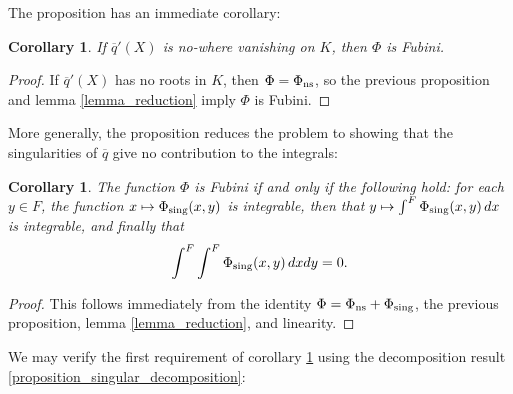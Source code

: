 \documentclass{lmsMODIFIED}
\newtheorem{corollary}[theorem]{Corollary}
\newcommand{\res}[1]{\overline{#1}}
\newcommand{\sub}[1]{{\mbox{\scriptsize {#1}}}}
\begin{document}
The proposition has an immediate corollary:

\begin{corollary}\label{corollary_nowhere_singular}
If $\res{q}'(X)$ is no-where vanishing on $ K $, then $\Phi$ is Fubini.
\end{corollary}
\begin{proof}
If $\res{q}'(X)$ has no roots in $ K $, then $\Phi=\Phi_\sub{ns}$, so the previous proposition and lemma \ref{lemma_reduction} imply $\Phi$ is Fubini.
\end{proof}

More generally, the proposition reduces the problem to showing that the singularities of $\res{q}$ give no contribution to the integrals:

\begin{corollary}\label{corollary_reduction_to_singular_part}
The function $\Phi$ is Fubini if and only if the following hold: for each $y\in F$, the function $x\mapsto\Phi_\sub{sing}(x,y)$ is integrable, then that $y\mapsto\int^F\Phi_\sub{sing}(x,y)\,dx$ is integrable, and finally that \[\int^F\int^F \Phi_\sub{sing}(x,y)\,dxdy=0.\]
\end{corollary}
\begin{proof}
This follows immediately from the identity $\Phi=\Phi_\sub{ns}+\Phi_\sub{sing}$, the previous proposition, lemma \ref{lemma_reduction}, and linearity.
\end{proof}

We may verify the first requirement of corollary \ref{corollary_reduction_to_singular_part} using the decomposition result \ref{proposition_singular_decomposition}:
\end{document}
